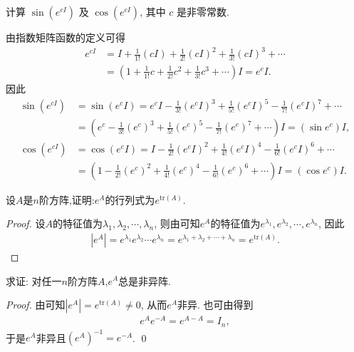 \documentclass[../../main.tex]{subfiles}
\begin{document}
\begin{example}
计算 $\sin(e^{cI})$ 及 $\cos(e^{cI})$, 其中 $c$ 是非零常数.
\end{example}
\begin{solution}
由指数矩阵函数的定义可得
\begin{align*}
e^{cI}&=I+\frac{1}{1!}(cI)+\frac{1}{2!}(cI)^2+\frac{1}{3!}(cI)^3+\cdots\\
&=\left( 1+\frac{1}{1!}c+\frac{1}{2!}c^2+\frac{1}{3!}c^3+\cdots \right) I = e^cI.
\end{align*}
因此
\begin{align*}
\sin(e^{cI})&=\sin(e^cI)=e^cI-\frac{1}{3!}(e^cI)^3+\frac{1}{5!}(e^cI)^5-\frac{1}{7!}(e^cI)^7+\cdots\\
&=\left( e^c-\frac{1}{3!}(e^c)^3+\frac{1}{5!}(e^c)^5-\frac{1}{7!}(e^c)^7+\cdots \right) I = (\sin e^c)I,\\
\cos(e^{cI})&=\cos(e^cI)=I-\frac{1}{2!}(e^cI)^2+\frac{1}{4!}(e^cI)^4-\frac{1}{6!}(e^cI)^6+\cdots\\
&=\left( 1-\frac{1}{2!}(e^c)^2+\frac{1}{4!}(e^c)^4-\frac{1}{6!}(e^c)^6+\cdots \right) I = (\cos e^c)I. 
\end{align*} 
\end{solution}

\begin{proposition}\label{proposition:矩阵函数e^A的行列式}
设$A$是$n$阶方阵,证明:$e^A$的行列式为$e^{\mathrm{tr}(A)}$.
\end{proposition}
\begin{proof}
设$A$的特征值为$\lambda_1,\lambda_2,\cdots,\lambda_n$, 则由可知$e^A$的特征值为$e^{\lambda_1},e^{\lambda_2},\cdots,e^{\lambda_n}$, 因此
\begin{align*}
|e^A| = e^{\lambda_1}e^{\lambda_2}\cdots e^{\lambda_n}=e^{\lambda_1 + \lambda_2 + \cdots + \lambda_n}=e^{\mathrm{tr}(A)}.
\end{align*} 
\end{proof}

\begin{corollary}
求证: 对任一$n$阶方阵$A$,$e^A$总是非异阵.
\end{corollary}
\begin{proof}
由可知$|e^A| = e^{\mathrm{tr}(A)}\neq 0$, 从而$e^A$非异. 也可由得到
\begin{align*}
e^Ae^{-A}=e^{A - A}=I_n,
\end{align*}
于是$e^A$非异且$(e^A)^{-1}=e^{-A}$. \qed 
\end{proof}
\end{document}
